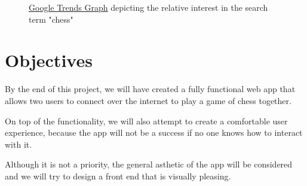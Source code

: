 \begin{figure}
    \begin{center}
        \caption{\href{https://trends.google.com/trends/explore?date=all&geo=GB&q=chess}{Google Trends Graph} depicting the relative interest in the search term "chess"}
        \label{ChessSearchTrend}
    \end{center}
\end{figure}

\section{Objectives}

By the end of this project, we will have created a fully functional web app that allows two users to connect over the internet to play a game of chess together.

On top of the functionality, we will also attempt to create a comfortable user experience, because the app will not be a success if no one knows how to interact with it.

Although it is not a priority, the general asthetic of the app will be considered and we will try to design a front end that is visually pleasing.






